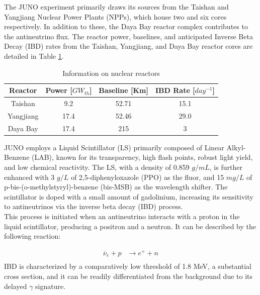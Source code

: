 The JUNO experiment primarily draws its sources from the Taishan and Yangjiang Nuclear Power Plants (NPPs), which house two and six cores respectively. In addition to these, the Daya Bay reactor complex contributes to the antineutrino flux. The reactor power, baselines, and anticipated Inverse Beta Decay (IBD) rates from the Taishan, Yangjiang, and Daya Bay reactor cores are detailed in Table \ref{tab:IBD_reactor_source}.


\begin{table}[htp]
	\centering
	\begin{tabular}{|c|c|c|c|}
		\hline
		Reactor & Power [$GW_{th}$] & Baseline [Km]  & IBD Rate [$day^{-1}$] \\\hline\hline
		Taishan & 9.2 & 52.71 &	15.1	\\\hline
		Yangjiang & 17.4 & 52.46 & 29.0	\\\hline
		Daya Bay & 17.4 & 215 &	3\\\hline
	\end{tabular}
	\caption{Information on nuclear reactors}
	\label{tab:IBD_reactor_source}
\end{table}


JUNO employs a Liquid Scintillator (LS) primarily composed of Linear Alkyl-Benzene (LAB), known for its transparency, high flash points, robust light yield, and low chemical reactivity. The LS, with a density of 0.859 $g/mL$, is further enhanced with 3 $g/L$ of 2,5-diphenyloxazole (PPO) as the fluor, and 15 $mg/L$ of p-bis-(o-methylstyryl)-benzene (bis-MSB) as the wavelength shifter. The scintillator is doped with a small amount of gadolinium, increasing its sensitivity to antineutrinos via the inverse beta decay (IBD) process.\\

This process is initiated when an antineutrino interacts with a proton in the liquid scintillator, producing a positron and a neutron. It can be described by the following reaction:

\begin{equation}
	\begin{aligned}
		\overline{\nu}_e + p &\rightarrow e^+ + n \\
	\end{aligned}
\end{equation} 
IBD is characterized by a comparatively low threshold of 1.8 MeV, a substantial cross section, and it can be readily differentiated from the background due to its delayed $\gamma$ signature.\\

